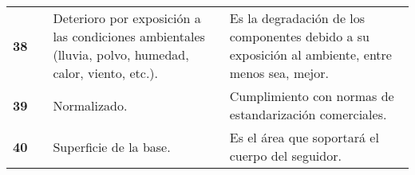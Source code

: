 \begin{table}[H]
\begin{tabular}{|c|c|p{10em}|p{21em}|}
		\cline{1-1}\cline{3-4}    \textbf{38} &       & Deterioro por exposición a las condiciones ambientales (lluvia, polvo, humedad, calor, viento, etc.). & Es la degradación de los componentes debido a su exposición al ambiente, entre menos sea, mejor. \\
		\cline{1-1}\cline{3-4}    \textbf{39} &       & Normalizado. & Cumplimiento con normas de estandarización comerciales. \\
		\cline{1-1}\cline{3-4}    \textbf{40} &       & Superficie de la base. & Es el área que soportará el cuerpo del seguidor. \\
		\hline
	\end{tabular}%
	\label{tab:addlabel3}%
\end{table}%

\newpage
